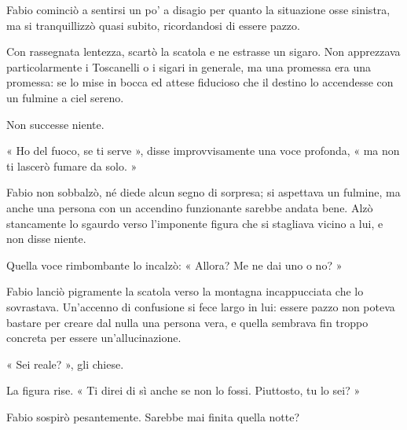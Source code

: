 Fabio cominciò a sentirsi un po' a disagio per quanto la situazione osse sinistra, ma si tranquillizzò quasi subito, ricordandosi di essere pazzo.

Con rassegnata lentezza, scartò la scatola e ne estrasse un sigaro. Non apprezzava particolarmente i Toscanelli o i sigari in generale, ma una promessa era una promessa: se lo mise in bocca ed attese fiducioso che il destino lo accendesse con un fulmine a ciel sereno.

Non successe niente.

« Ho del fuoco, se ti serve », disse improvvisamente una voce profonda, « ma non ti lascerò fumare da solo. »

Fabio non sobbalzò, né diede alcun segno di sorpresa; si aspettava un fulmine, ma anche una persona con un accendino funzionante sarebbe andata bene. Alzò stancamente lo sgaurdo verso l'imponente figura che si stagliava vicino a lui, e non disse niente.

Quella voce rimbombante lo incalzò: « Allora? Me ne dai uno o no? »

Fabio lanciò pigramente la scatola verso la montagna incappucciata che lo sovrastava. Un'accenno di confusione si fece largo in lui: essere pazzo non poteva bastare per creare dal nulla una persona vera, e quella sembrava fin troppo concreta per essere un'allucinazione.

« Sei reale? », gli chiese.

La figura rise. « Ti direi di sì anche se non lo fossi. Piuttosto, tu lo sei? »

Fabio sospirò pesantemente. Sarebbe mai finita quella notte?
